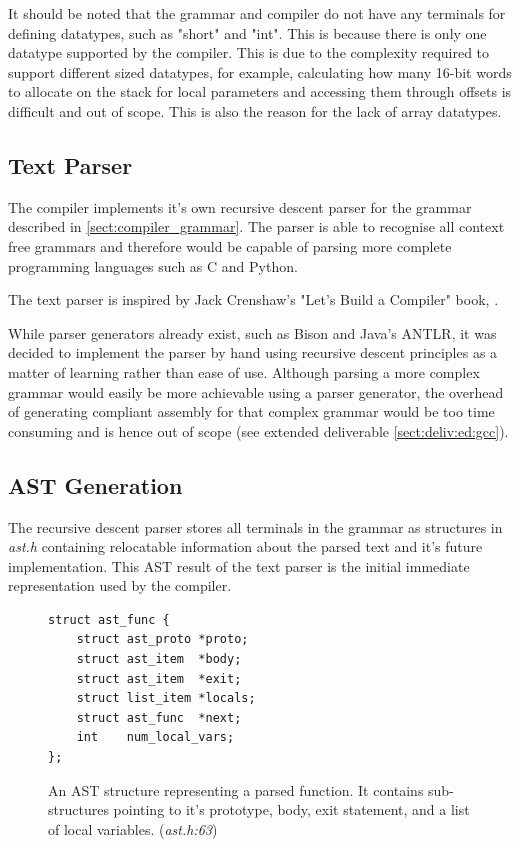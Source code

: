 \documentclass[11pt,a4paper]{report}
\begin{document}
It should be noted that the grammar and compiler do not have any terminals for defining datatypes, such as "short" and "int". This is because there is only one datatype supported by the compiler. This is due to the complexity required to support different sized datatypes, for example, calculating how many 16-bit words to allocate on the stack for local parameters and accessing them through offsets is difficult and out of scope. This is also the reason for the lack of array datatypes.

\subsection{Text Parser}
The compiler implements it's own recursive descent parser for the grammar described in \ref{sect:compiler_grammar}. The parser is able to recognise all context free grammars and therefore would be capable of parsing more complete programming languages such as C and Python. 

The text parser is inspired by Jack Crenshaw's "Let's Build a Compiler" book, \citep{crenshaw1988let}.

While parser generators already exist, such as Bison and Java's ANTLR, it was decided to implement the parser by hand using recursive descent principles as a matter of learning rather than ease of use. Although parsing a more complex grammar would easily be more achievable using a parser generator, the overhead of generating compliant assembly for that complex grammar would be too time consuming and is hence out of scope (see extended deliverable \ref{sect:deliv:ed:gcc}).

\subsection{AST Generation}
\label{sect:compiler_ast}
The recursive descent parser stores all terminals in the grammar as structures in \textit{ast.h} containing relocatable information about the parsed text and it's future implementation. This AST result of the text parser is the initial immediate representation used by the compiler.

\begin{figure}[H]
\centering 
\begin{minipage}{0.4\textwidth}
\begin{verbatim}
struct ast_func {
    struct ast_proto *proto;
    struct ast_item  *body;
    struct ast_item  *exit;
    struct list_item *locals;
    struct ast_func  *next;
    int    num_local_vars;
};
\end{verbatim}
\end{minipage}
\caption{An AST structure representing a parsed function. It contains sub-structures pointing to it's prototype, body, exit statement, and a list of local variables. (\textit{ast.h:63})}
\end{figure}
\end{document}
